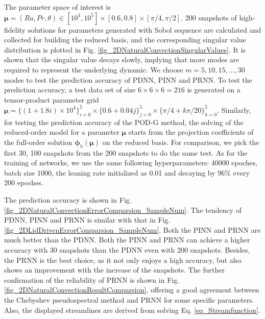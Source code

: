 \documentclass[preprint, 10pt]{elsarticle}
\begin{document}
The parameter space of interest is $\pmb{\mu}=(Ra, Pr, \theta) \in [10^4, 10^5] \times [0.6, 0.8] \times[\pi/4, \pi/2]$. 200 snapshots of high-fidelity solutions for parameters generated with Sobol sequence are calculated and collected for building the reduced basis, and the corresponding singular value distribution is plotted in Fig. \ref{fig_2DNaturalConvectionSingularValues}. It is shown that the singular value decays slowly, implying that more modes are required to represent the underlying dynamic. We choose $m=5, 10, 15,...,30$ modes to test the prediction accuracy of PDNN, PINN and PRNN.
To test the prediction accuracy, a test data set of size $6 \times 6 \times 6=216$ is generated on a tensor-product parameter grid $\pmb{\mu}=\{(1+ 1.8i)\times 10^4\}_{i=0}^{5} \times \{0.6+ 0.04j\}_{j=0}^{5} \times \{\pi/4+ k\pi/20\}_{k=0}^{5}$.
Similarly, for testing the prediction accuracy of the POD-G method, the solving of the reduced-order model for a parameter $\pmb{\mu}$ starts from the projection coefficients of the full-order solution $\pmb{\phi}_h \left( \pmb{\mu} \right)$ on the reduced basis.
For comparison, we pick the first 30, 100 snapshots from the 200 snapshots to do the same test. As for the training of networks, we use the same following hyperparameters: 40000 epoches, batch size 1000, the leaning rate initialized as 0.01 and decaying by 96\% every 200 epoches.

The prediction accuracy is shown in Fig. \ref{fig_2DNaturalConvectionErrorComparsion_SampleNum}. The tendency of PDNN, PINN and PRNN is similar with that in Fig. \ref{fig_2DLidDrivenErrorComparsion_SampleNum}. Both the PINN and PRNN are much better than the PDNN.  Both the PINN and PRNN can achieve a higher accuracy with 30 snapshots than the PDNN even with 200 snapshots. Besides, the PRNN is the best choice, as it not only enjoys a high accuracy, but also shows an improvement with the increase of the snapshots. The further confirmation of the reliability of PRNN is shown in Fig. \ref{fig_2DNaturalConvectionResultComparsion}, offering a good agreement between the Chebyshev pseudospectral method and PRNN for some specific parameters. Also, the displayed streamlines are derived from solving Eq. \ref{eq_Streamfunction}.
\end{document}
